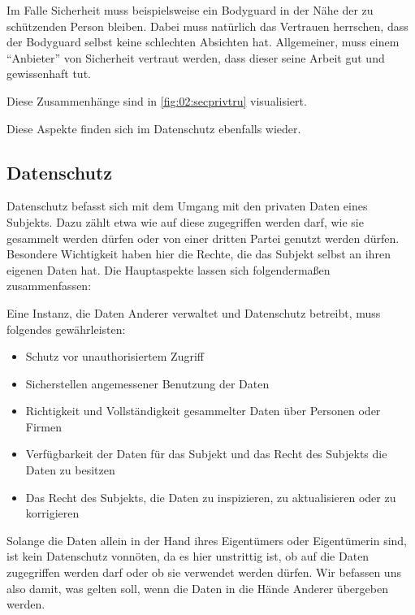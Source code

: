 Im Falle Sicherheit muss beispielsweise ein Bodyguard in der Nähe der zu schützenden Person bleiben.
Dabei muss natürlich das Vertrauen herrschen, dass der Bodyguard selbst keine schlechten Absichten hat.
Allgemeiner, muss einem \enquote{Anbieter} von Sicherheit vertraut werden, dass dieser seine Arbeit gut und gewissenhaft tut.

Diese Zusammenhänge sind in \cref{fig:02:secprivtru} visualisiert.

Diese Aspekte finden sich im Datenschutz ebenfalls wieder.

\subsection{Datenschutz}

Datenschutz befasst sich mit dem Umgang mit den privaten Daten eines Subjekts.
Dazu zählt etwa wie auf diese zugegriffen werden darf, wie sie gesammelt werden dürfen oder von einer dritten Partei genutzt werden dürfen.
Besondere Wichtigkeit haben hier die Rechte, die das Subjekt selbst an ihren eigenen Daten hat.
Die Hauptaspekte lassen sich folgendermaßen zusammenfassen: \cite{lee_ethical_2016}  

\begin{center}
\parbox{0.9\textwidth}{
    Eine Instanz, die Daten Anderer verwaltet und Datenschutz betreibt, muss folgendes gewährleisten: 
    \begin{itemize}
        \item Schutz vor unauthorisiertem Zugriff
        \item Sicherstellen angemessener Benutzung der Daten
        \item Richtigkeit und Vollständigkeit gesammelter Daten über Personen oder Firmen
        \item Verfügbarkeit der Daten für das Subjekt und das Recht des Subjekts die Daten zu besitzen
        \item Das Recht des Subjekts, die Daten zu inspizieren, zu aktualisieren oder zu korrigieren
    \end{itemize}
}
\end{center}

Solange die Daten allein in der Hand ihres Eigentümers oder Eigentümerin sind, ist kein Datenschutz vonnöten,
da es hier unstrittig ist, ob auf die Daten zugegriffen werden darf oder ob sie verwendet werden dürfen.
Wir befassen uns also damit, was gelten soll, wenn die Daten in die Hände Anderer übergeben werden.

